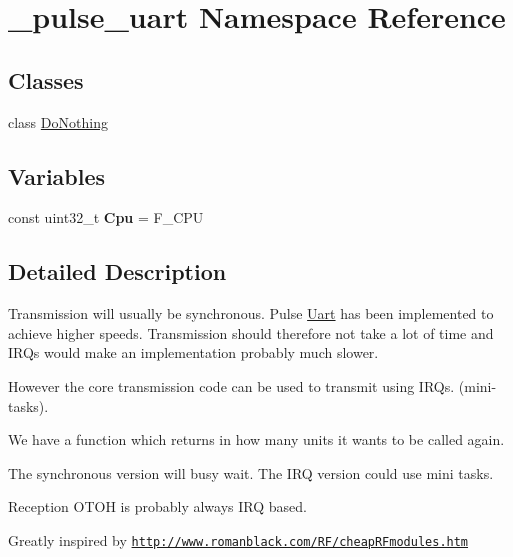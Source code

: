 \hypertarget{namespace__pulse__uart}{}\section{\+\_\+pulse\+\_\+uart Namespace Reference}
\label{namespace__pulse__uart}
\subsection*{Classes}
\begin{DoxyCompactItemize}
\item 
class \hyperlink{class__pulse__uart_1_1DoNothing}{Do\+Nothing}
\end{DoxyCompactItemize}
\subsection*{Variables}
\begin{DoxyCompactItemize}
\item 
const uint32\+\_\+t {\bfseries Cpu} = F\+\_\+\+C\+PU\hypertarget{namespace__pulse__uart_a54a3816b5d606db8b8ca8bcb568eeb85}{}\label{namespace__pulse__uart_a54a3816b5d606db8b8ca8bcb568eeb85}

\end{DoxyCompactItemize}


\subsection{Detailed Description}
Transmission will usually be synchronous. Pulse \hyperlink{classUart}{Uart} has been implemented to achieve higher speeds. Transmission should therefore not take a lot of time and I\+R\+Qs would make an implementation probably much slower.

However the core transmission code can be used to transmit using I\+R\+Qs. (mini-\/tasks).

We have a function which returns in how many units it wants to be called again.

The synchronous version will busy wait. The I\+RQ version could use mini tasks.

Reception O\+T\+OH is probably always I\+RQ based.

Greatly inspired by \href{http://www.romanblack.com/RF/cheapRFmodules.htm}{\tt http\+://www.\+romanblack.\+com/\+R\+F/cheap\+R\+Fmodules.\+htm} 